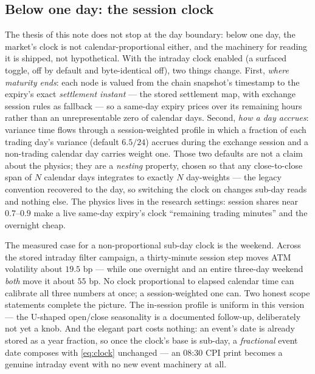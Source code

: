 \documentclass[11pt]{article}
\begin{document}
\subsection{Below one day: the session clock}
\label{sec:sessionclock}

The thesis of this note does not stop at the day boundary: below one
day, the market's clock is not calendar-proportional either, and the
machinery for reading it is shipped, not hypothetical.  With the
intraday clock enabled (a surfaced toggle, off by default and
byte-identical off), two things change.  First, \emph{where maturity
ends}: each node is valued from the chain snapshot's timestamp to the
expiry's exact \emph{settlement instant} --- the stored settlement map,
with exchange session rules as fallback --- so a same-day expiry prices
over its remaining hours rather than an unrepresentable zero of
calendar days.  Second, \emph{how a day accrues}: variance time flows
through a session-weighted profile in which a fraction of each trading
day's variance (default $6.5/24$) accrues during the exchange session
and a non-trading calendar day carries weight one.  Those two defaults
are not a claim about the physics; they are a \emph{nesting} property,
chosen so that any close-to-close span of $N$ calendar days integrates
to exactly $N$ day-weights --- the legacy convention recovered to the
day, so switching the clock on changes sub-day reads and nothing else.
The physics lives in the research settings: session shares near
$0.7$--$0.9$ make a live same-day expiry's clock ``remaining trading
minutes'' and the overnight cheap.

The measured case for a non-proportional sub-day clock is the weekend.
Across the stored intraday filter campaign, a thirty-minute session
step moves ATM volatility about $19.5$ bp --- while one overnight and
an entire three-day weekend \emph{both} move it about $55$ bp.  No
clock proportional to elapsed calendar time can calibrate all three
numbers at once; a session-weighted one can.  Two honest scope
statements complete the picture.  The in-session profile is uniform in
this version --- the U-shaped open/close seasonality is a documented
follow-up, deliberately not yet a knob.  And the elegant part costs
nothing: an event's date is already stored as a year fraction, so once
the clock's base is sub-day, a \emph{fractional} event date composes
with \eqref{eq:clock} unchanged --- an 08:30 CPI print becomes a
genuine intraday event with no new event machinery at all.
\end{document}
